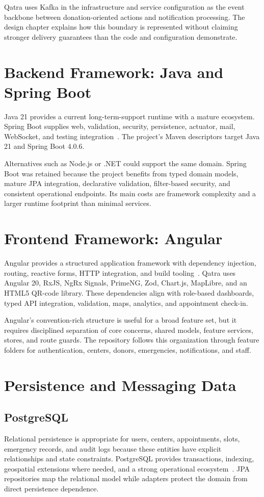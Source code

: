 Qatra uses Kafka in the infrastructure and service configuration as the event backbone between donation-oriented actions and notification processing. The design chapter explains how this boundary is represented without claiming stronger delivery guarantees than the code and configuration demonstrate.

\section{Backend Framework: Java and Spring Boot}
Java 21 provides a current long-term-support runtime with a mature ecosystem. Spring Boot supplies web, validation, security, persistence, actuator, mail, WebSocket, and testing integration~\cite{spring}. The project's Maven descriptors target Java 21 and Spring Boot 4.0.6.

Alternatives such as Node.js or .NET could support the same domain. Spring Boot was retained because the project benefits from typed domain models, mature JPA integration, declarative validation, filter-based security, and consistent operational endpoints. Its main costs are framework complexity and a larger runtime footprint than minimal services.

\section{Frontend Framework: Angular}
Angular provides a structured application framework with dependency injection, routing, reactive forms, HTTP integration, and build tooling~\cite{angular}. Qatra uses Angular 20, RxJS, NgRx Signals, PrimeNG, Zod, Chart.js, MapLibre, and an HTML5 QR-code library. These dependencies align with role-based dashboards, typed API integration, validation, maps, analytics, and appointment check-in.

Angular's convention-rich structure is useful for a broad feature set, but it requires disciplined separation of core concerns, shared models, feature services, stores, and route guards. The repository follows this organization through feature folders for authentication, centers, donors, emergencies, notifications, and staff.

\section{Persistence and Messaging Data}
\subsection{PostgreSQL}
Relational persistence is appropriate for users, centers, appointments, slots, emergency records, and audit logs because these entities have explicit relationships and state constraints. PostgreSQL provides transactions, indexing, geospatial extensions where needed, and a strong operational ecosystem~\cite{postgresql}. JPA repositories map the relational model while adapters protect the domain from direct persistence dependence.

